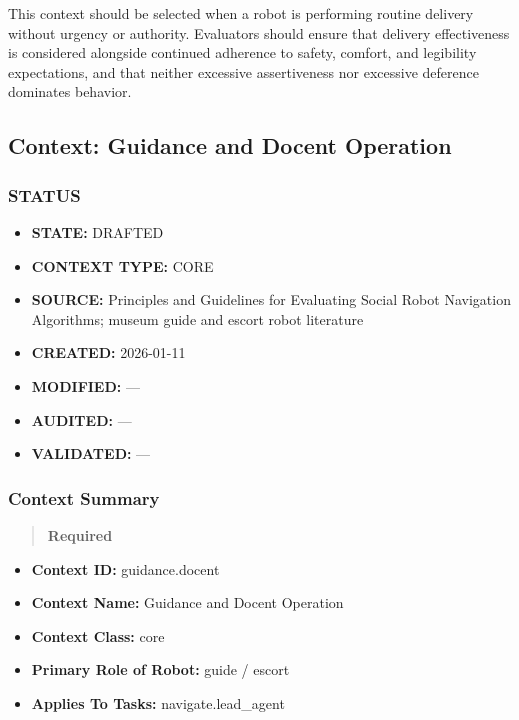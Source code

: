 \documentclass[utf8]{frontiers_suppmat} %
\providecommand{\tightlist}{%
  \setlength{\itemsep}{0pt}\setlength{\parskip}{0pt}}
\begin{document}
This context should be selected when a robot is performing routine
delivery without urgency or authority. Evaluators should ensure that
delivery effectiveness is considered alongside continued adherence to
safety, comfort, and legibility expectations, and that neither excessive
assertiveness nor excessive deference dominates behavior.

\subsection{Context: Guidance and Docent
Operation}\label{context-guidance-and-docent-operation}

\subsubsection{STATUS}\label{status}

\begin{itemize}
\tightlist
\item
  \textbf{STATE:} DRAFTED
\item
  \textbf{CONTEXT TYPE:} CORE
\item
  \textbf{SOURCE:} Principles and Guidelines for Evaluating Social Robot
  Navigation Algorithms; museum guide and escort robot literature
\item
  \textbf{CREATED:} 2026-01-11
\item
  \textbf{MODIFIED:} ---
\item
  \textbf{AUDITED:} ---
\item
  \textbf{VALIDATED:} ---
\end{itemize}


\subsubsection{Context Summary}\label{context-summary}

\begin{quote}
\textbf{Required}
\end{quote}

\begin{itemize}
\tightlist
\item
  \textbf{Context ID:} guidance.docent
\item
  \textbf{Context Name:} Guidance and Docent Operation
\item
  \textbf{Context Class:} core
\item
  \textbf{Primary Role of Robot:} guide / escort
\item
  \textbf{Applies To Tasks:} navigate.lead\_agent
\end{itemize}
\end{document}
